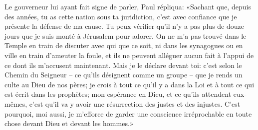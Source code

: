 Le gouverneur lui ayant fait signe de parler, Paul répliqua:
	«Sachant que, depuis des années, tu as cette nation sous ta juridiction,
	c’est avec confiance que je présente la défense de ma cause.
	Tu peux vérifier qu’il n’y a pas plus de douze jours
		que je suis monté à Jérusalem pour adorer.
On ne m’a pas trouvé dans le Temple en train de discuter avec qui que ce soit,
	ni dans les synagogues ou en ville en train d’ameuter la foule,
	et ils ne peuvent alléguer aucun fait
		à l’appui de ce dont ils m’accusent maintenant.
Mais je le déclare devant toi: c’est selon le Chemin du Seigneur
	– ce qu’ils désignent comme un groupe –
	que je rends un culte au Dieu de nos pères;
	je crois à tout ce qu’il y a dans la Loi
	et à tout ce qui est écrit dans les prophètes;
	mon espérance en Dieu, et ce qu’ils attendent eux-mêmes,
	c’est qu’il va y avoir une résurrection des justes et des injustes.
C’est pourquoi, moi aussi,
	je m’efforce de garder une conscience irréprochable en toute chose
	devant Dieu et devant les hommes.»
